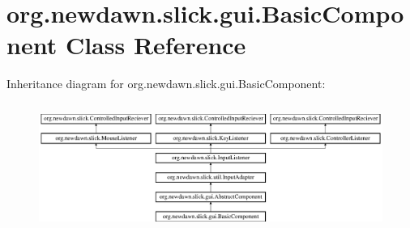 \hypertarget{classorg_1_1newdawn_1_1slick_1_1gui_1_1_basic_component}{}\section{org.\+newdawn.\+slick.\+gui.\+Basic\+Component Class Reference}
\label{classorg_1_1newdawn_1_1slick_1_1gui_1_1_basic_component}
Inheritance diagram for org.\+newdawn.\+slick.\+gui.\+Basic\+Component\+:\begin{figure}[H]
\begin{center}
\leavevmode
\includegraphics[height=4.226415cm]{classorg_1_1newdawn_1_1slick_1_1gui_1_1_basic_component}
\end{center}
\end{figure}
